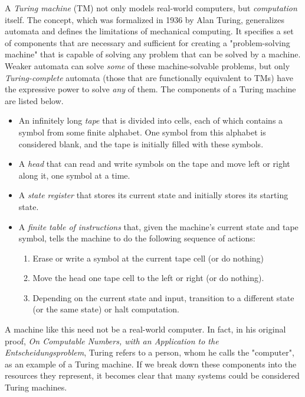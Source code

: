 A \textit{Turing machine} (TM) not only models real-world computers, but \textit{computation} itself. The concept, which was formalized in 1936 by Alan Turing, generalizes automata and defines the limitations of mechanical computing. It specifies a set of components that are necessary and sufficient for creating a "problem-solving machine" that is capable of solving any problem that can be solved by a machine. Weaker automata can solve \textit{some} of these machine-solvable problems, but only \textit{Turing-complete} automata (those that are functionally equivalent to TMs) have the expressive power to solve \textit{any} of them. The components of a Turing machine are listed below.

\begin{itemize}
\item An infinitely long \textit{tape} that is divided into cells, each of which contains a symbol from some finite alphabet. One symbol from this alphabet is considered blank, and the tape is initially filled with these symbols.
\item A \textit{head} that can read and write symbols on the tape and move left or right along it, one symbol at a time.
\item A \textit{state register} that stores its current state and initially stores its starting state.
\item A \textit{finite table of instructions} that, given the machine's current state and tape symbol, tells the machine to do the following sequence of actions:
	\begin{enumerate}
		\item Erase or write a symbol at the current tape cell (or do nothing)
		\item Move the head one tape cell to the left or right (or do nothing).
		\item Depending on the current state and input, transition to a different state (or the same state) or halt computation.
	\end{enumerate}
\end{itemize}

A machine like this need not be a real-world computer. In fact, in his original proof, \textit{On Computable Numbers, with an Application to the Entscheidungsproblem}, Turing refers to a person, whom he calls the "computer", as an example of a Turing machine. If we break down these components into the resources they represent, it becomes clear that many systems could be considered Turing machines.

